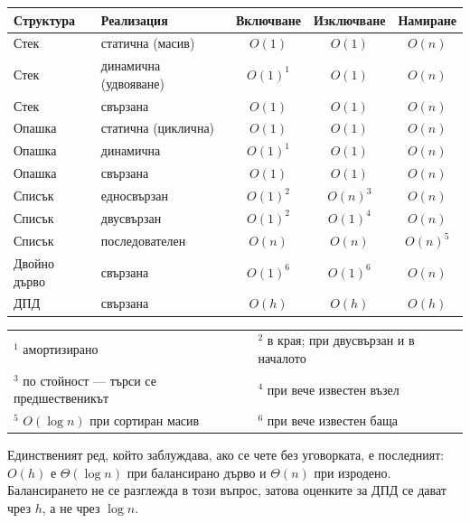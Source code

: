 \begin{center}
\small
\begin{tabular}{llccc}
\toprule
Структура & Реализация & Включване & Изключване & Намиране\\
\midrule
Стек   & статична (масив)      & $O(1)$                    & $O(1)$                    & $O(n)$\\
Стек   & динамична (удвояване) & $O(1)^{1}$                & $O(1)$                    & $O(n)$\\
Стек   & свързана              & $O(1)$                    & $O(1)$                    & $O(n)$\\
\midrule
Опашка & статична (циклична)   & $O(1)$                    & $O(1)$                    & $O(n)$\\
Опашка & динамична             & $O(1)^{1}$                & $O(1)$                    & $O(n)$\\
Опашка & свързана              & $O(1)$                    & $O(1)$                    & $O(n)$\\
\midrule
Списък & едносвързан           & $O(1)^{2}$                & $O(n)^{3}$                & $O(n)$\\
Списък & двусвързан            & $O(1)^{2}$                & $O(1)^{4}$                & $O(n)$\\
Списък & последователен        & $O(n)$                    & $O(n)$                    & $O(n)^{5}$\\
\midrule
Двойно дърво & свързана        & $O(1)^{6}$                & $O(1)^{6}$                & $O(n)$\\
ДПД          & свързана        & $O(h)$                    & $O(h)$                    & $O(h)$\\
\bottomrule
\end{tabular}
\end{center}

\begin{center}
\small
\begin{tabular}{@{}ll@{}}
$^{1}$ амортизирано & $^{2}$ в края; при двусвързан и в началото\\
$^{3}$ по стойност --- търси се предшественикът & $^{4}$ при вече известен възел\\
$^{5}$ $O(\log n)$ при сортиран масив & $^{6}$ при вече известен баща\\
\end{tabular}
\end{center}

Единственият ред, който заблуждава, ако се чете без уговорката, е последният:
$O(h)$ е $\Theta(\log n)$ при балансирано дърво и $\Theta(n)$ при изродено.
Балансирането не се разглежда в този въпрос, затова оценките за ДПД се дават
чрез $h$, а не чрез $\log n$.

